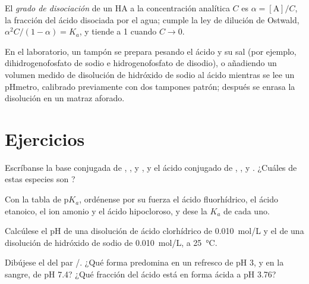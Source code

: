 \begin{definition}\label{def:b1:predominant-reaction:dissociation}
El \emph{grado de disociación} de un  HA a la concentración analítica $C$ es $\alpha = [\mathrm{A}]/C$, la
fracción del ácido disociada por el agua; cumple la ley de dilución de
Ostwald, $\alpha^2C/(1 - \alpha) = K_a$, y tiende a 1 cuando $C \to 0$.
\end{definition}

\begin{inthelab}
En el laboratorio, un tampón se prepara pesando el ácido y su sal (por
ejemplo, dihidrogenofosfato de sodio e hidrogenofosfato de disodio), o
añadiendo un volumen medido de disolución de hidróxido de sodio al ácido
mientras se lee un pHmetro, calibrado previamente con dos tampones
patrón; después se enrasa la disolución en un matraz aforado.
\end{inthelab}

\section{Ejercicios}

\begin{exercise}[$\star$]\label{exo:b1:predominant-reaction:1}
Escríbanse la base conjugada de , ,  y
, y el ácido conjugado de , ,  y
. ¿Cuáles de estas especies son ?
\end{exercise}

\begin{exercise}[$\star$]\label{exo:b1:predominant-reaction:2}
Con la tabla de $\mathrm{p}K_a$, ordénense por su fuerza el ácido
fluorhídrico, el ácido etanoico, el ion amonio y el ácido hipocloroso, y
dese la $K_a$ de cada uno.
\end{exercise}

\begin{exercise}[$\star$]\label{exo:b1:predominant-reaction:3}
Calcúlese el pH de una disolución de ácido clorhídrico de
\qty{0.010}{mol/L} y el de una disolución de hidróxido de sodio de
\qty{0.010}{mol/L}, a \qty{25}{\celsius}.
\end{exercise}

\begin{exercise}[$\star$]\label{exo:b1:predominant-reaction:4}
Dibújese el  del par /.
¿Qué forma predomina en un refresco de pH 3, y en la sangre, de pH 7.4?
¿Qué fracción del ácido está en forma ácida a pH 3.76?
\end{exercise}

